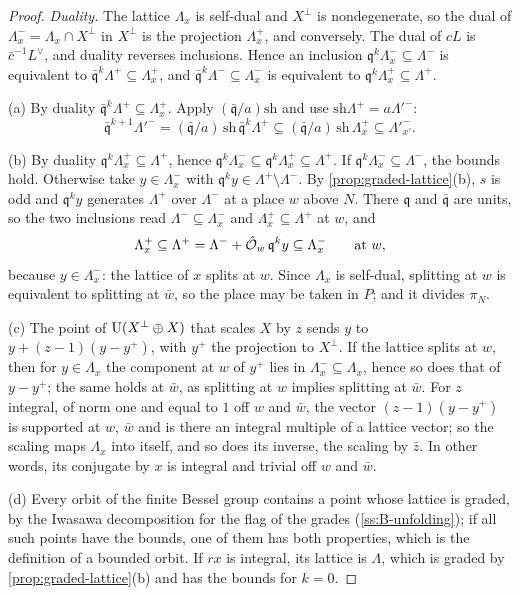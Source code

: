 \begin{proof}
\emph{Duality.} The lattice $\Lambda_x$ is self-dual and $X^\perp$ is nondegenerate, so the dual of $\Lambda^-_x=\Lambda_x\cap X^\perp$ in $X^\perp$ is the projection $\Lambda^+_x$, and conversely. The dual of $cL$ is $\bar c^{-1}L^\vee$, and duality reverses inclusions. Hence an inclusion $\mathfrak q^k\Lambda^-_x\subseteq\Lambda^-$ is equivalent to
$\bar{\mathfrak q}^k\Lambda^+\subseteq\Lambda^+_x$, and $\bar{\mathfrak q}^k\Lambda^-\subseteq\Lambda^-_x$ is equivalent to $\mathfrak q^k\Lambda^+_x\subseteq\Lambda^+$.

(a) By duality $\bar{\mathfrak q}^k\Lambda^+\subseteq\Lambda^+_x$. Apply $(\bar{\mathfrak q}/a)\mathrm{sh}$ and use $\mathrm{sh}\Lambda^+=a\Lambda'^-$:
\[
  \bar{\mathfrak q}^{k+1}\Lambda'^-=(\bar{\mathfrak q}/a)\,\mathrm{sh}\,\bar{\mathfrak q}^k\Lambda^+\subseteq(\bar{\mathfrak q}/a)\,\mathrm{sh}\,\Lambda^+_x\subseteq\Lambda'^-_{x'} .
\]

(b) By duality $\mathfrak q^k\Lambda^+_x\subseteq\Lambda^+$, hence $\mathfrak q^k\Lambda^-_x\subseteq\mathfrak q^k\Lambda^+_x\subseteq\Lambda^+$. If $\mathfrak q^k\Lambda^-_x\subseteq\Lambda^-$, the bounds hold. Otherwise take $y\in\Lambda^-_x$ with $\mathfrak q^ky\in\Lambda^+\setminus\Lambda^-$. By \cref{prop:graded-lattice}(b), $s$ is odd and $\mathfrak q^ky$ generates
$\Lambda^+$ over $\Lambda^-$ at a place $w$ above $N$. There $\mathfrak q$ and $\bar{\mathfrak q}$ are units, so the two inclusions read $\Lambda^-\subseteq\Lambda^-_x$ and $\Lambda^+_x\subseteq\Lambda^+$ at $w$, and
\[
  \Lambda^+_x\subseteq\Lambda^+=\Lambda^-+\hat{\mathcal{O}}_w\,\mathfrak q^ky\subseteq\Lambda^-_x\qquad\text{at }w ,
\]
because $y\in\Lambda^-_x$: the lattice of $x$ splits at $w$. Since $\Lambda_x$ is self-dual, splitting at $w$ is equivalent to splitting at $\bar w$, so the place may be taken in $P$; and it divides $\pi_N$.

(c) The point of $\operatorname{U}(X^\perp\oplus X)$ that scales $X$ by $z$ sends $y$ to $y+(z-1)(y-y^+)$, with $y^+$ the projection to $X^\perp$. If the lattice splits at $w$, then for $y\in\Lambda_x$ the component at $w$ of $y^+$ lies in $\Lambda^-_x\subseteq\Lambda_x$, hence so does that of $y-y^+$; the same holds at $\bar w$, as splitting at $w$ implies splitting at $\bar w$. For $z$
integral, of norm one and equal to $1$ off $w$ and $\bar w$, the vector $(z-1)(y-y^+)$ is supported at $w$, $\bar w$ and is there an integral multiple of a lattice vector; so the scaling maps $\Lambda_x$ into itself, and so does its inverse, the scaling by $\bar z$. In other words, its conjugate by $x$ is integral and trivial off $w$ and
$\bar w$.

(d) Every orbit of the finite Bessel group contains a point whose lattice is graded, by the Iwasawa decomposition for the flag of the grades (\cref{ss:B-unfolding}); if all such points have the bounds, one of them has both properties, which is the definition of a bounded orbit. If $rx$ is integral, its lattice is $\Lambda$, which is graded by
\cref{prop:graded-lattice}(b) and has the bounds for $k=0$.
\end{proof}

